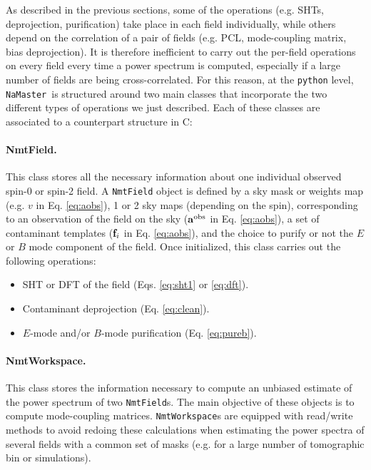 \documentclass[usenatbib]{mnrasb}
\newcommand{\nmt}{{\tt NaMaster}}
\begin{document}
    As described in the previous sections, some of the operations (e.g. SHTs, deprojection, purification) take place in each field individually, while others depend on the correlation of a pair of fields (e.g. PCL, mode-coupling matrix, bias deprojection). It is therefore inefficient to carry out the per-field operations on every field every time a power spectrum is computed, especially if a large number of fields are being cross-correlated. For this reason, at the \texttt{python} level, \nmt~is structured around two main classes that incorporate the two different types of operations we just described. Each of these classes are associated to a counterpart structure in C:
    
    \paragraph*{NmtField.} This class stores all the necessary information about one individual observed spin-0 or spin-2 field. A {\tt NmtField} object is defined by a sky mask or weights map (e.g. $v$ in Eq. \ref{eq:aobs}), 1 or 2 sky maps (depending on the spin), corresponding to an observation of the field on the sky (${\bf a}^{\rm obs}$ in Eq. \ref{eq:aobs}), a set of contaminant templates (${\bf f}_i$ in Eq. \ref{eq:aobs}), and the choice to purify or not the $E$ or $B$ mode component of the field. Once initialized, this class carries out the following operations:
    \begin{itemize}
      \item SHT or DFT of the field (Eqs. \ref{eq:sht1} or \ref{eq:dft}).
      \item Contaminant deprojection (Eq. \ref{eq:clean}).
      \item $E$-mode and/or $B$-mode purification (Eq. \ref{eq:pureb}).
    \end{itemize}
    
    \paragraph*{NmtWorkspace.} This class stores the information necessary to compute an unbiased estimate of the power spectrum of two {\tt NmtField}s. The main objective of these objects is to compute mode-coupling matrices. {\tt NmtWorkspace}s are equipped with read/write methods to avoid redoing these calculations when estimating the power spectra of several fields with a common set of masks (e.g. for a large number of tomographic bin or simulations).
    
\end{document}
